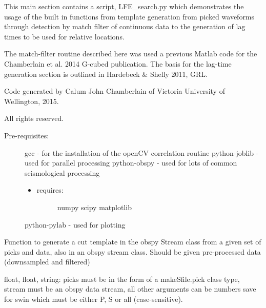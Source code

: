 \documentclass[a4paper,10pt,english]{sphinxmanual}
\begin{document}
This main section contains a script, LFE\_search.py which demonstrates the usage
of the built in functions from template generation from picked waveforms
through detection by match filter of continuous data to the generation of lag
times to be used for relative locations.

The match-filter routine described here was used a previous Matlab code for the
Chamberlain et al. 2014 G-cubed publication.  The basis for the lag-time
generation section is outlined in Hardebeck \& Shelly 2011, GRL.

Code generated by Calum John Chamberlain of Victoria University of Wellington,
2015.

All rights reserved.
\begin{description}
\item[{Pre-requisites:}] \leavevmode
gcc             - for the installation of the openCV correlation routine
python-joblib   - used for parallel processing
python-obspy    - used for lots of common seismological processing
\begin{itemize}
\item {} \begin{description}
\item[{requires:}] \leavevmode
numpy
scipy
matplotlib

\end{description}

\end{itemize}

python-pylab    - used for plotting

\end{description}

\begin{fulllineitems}
\label{modules:template_gen._template_gen}
Function to generate a cut template in the obspy
Stream class from a given set of picks and data, also in an obspy stream
class.  Should be given pre-processed data (downsampled and filtered)
\begin{quote}\begin{description}
\end{description}\end{quote}

float, float, string: picks must be in the form of a makeSfile.pick class
type, stream must be an obspy data stream, all other arguments can be
numbers save for swin which must be either P, S or all (case-sensitive).

\end{fulllineitems}
\end{document}

